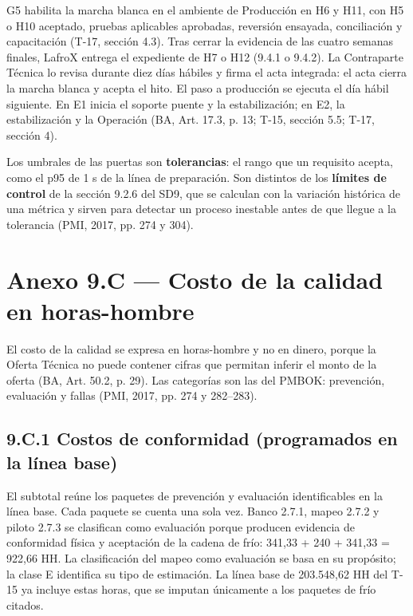 G5 habilita la marcha blanca en el ambiente de Producción en H6 y H11, con H5 o H10 aceptado, pruebas aplicables aprobadas, reversión ensayada, conciliación y capacitación (T-17, sección 4.3). Tras cerrar la evidencia de las cuatro semanas finales, LafroX entrega el expediente de H7 o H12 (9.4.1 o 9.4.2). La Contraparte Técnica lo revisa durante diez días hábiles y firma el acta integrada: el acta cierra la marcha blanca y acepta el hito. El paso a producción se ejecuta el día hábil siguiente. En E1 inicia el soporte puente y la estabilización; en E2, la estabilización y la Operación (BA, Art. 17.3, p. 13; T-15, sección 5.5; T-17, sección 4).

Los umbrales de las puertas son \textbf{tolerancias}: el rango que un requisito acepta, como el p95 de 1 s de la línea de preparación. Son distintos de los \textbf{límites de control} de la sección 9.2.6 del SD9, que se calculan con la variación histórica de una métrica y sirven para detectar un proceso inestable antes de que llegue a la tolerancia (PMI, 2017, pp. 274 y 304).

\section*{Anexo 9.C — Costo de la calidad en horas-hombre}

El costo de la calidad se expresa en horas-hombre y no en dinero, porque la Oferta Técnica no puede contener cifras que permitan inferir el monto de la oferta (BA, Art. 50.2, p. 29). Las categorías son las del PMBOK: prevención, evaluación y fallas (PMI, 2017, pp. 274 y 282–283).

\subsection*{9.C.1 Costos de conformidad (programados en la línea base)}

El subtotal reúne los paquetes de prevención y evaluación identificables en la línea base. Cada paquete se cuenta una sola vez. Banco 2.7.1, mapeo 2.7.2 y piloto 2.7.3 se clasifican como evaluación porque producen evidencia de conformidad física y aceptación de la cadena de frío: 341,33 + 240 + 341,33 = 922,66 HH. La clasificación del mapeo como evaluación se basa en su propósito; la clase E identifica su tipo de estimación. La línea base de 203.548,62 HH del T-15 ya incluye estas horas, que se imputan únicamente a los paquetes de frío citados.

